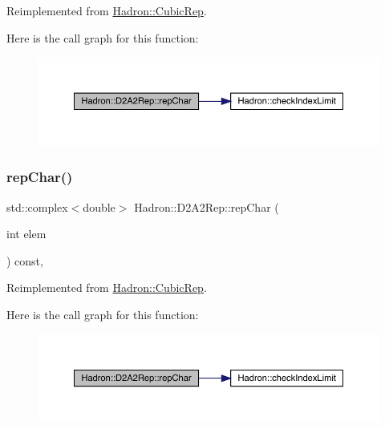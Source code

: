 Reimplemented from \mbox{\hyperlink{structHadron_1_1CubicRep_af45227106e8e715e84b0af69cd3b36f8}{Hadron\+::\+Cubic\+Rep}}.

Here is the call graph for this function\+:
\nopagebreak
\begin{figure}[H]
\begin{center}
\leavevmode
\includegraphics[width=350pt]{d2/dfc/structHadron_1_1D2A2Rep_a27712e402af9b022dee4cccf805ebe86_cgraph}
\end{center}
\end{figure}
\mbox{\label{structHadron_1_1D2A2Rep_a27712e402af9b022dee4cccf805ebe86}} 
\subsubsection{\texorpdfstring{repChar()}{repChar()}\hspace{0.1cm}{\footnotesize\ttfamily [3/3]}}
{\footnotesize\ttfamily std\+::complex$<$double$>$ Hadron\+::\+D2\+A2\+Rep\+::rep\+Char (\begin{DoxyParamCaption}\item[{int}]{elem }\end{DoxyParamCaption}) const\hspace{0.3cm}{\ttfamily [inline]}, {\ttfamily [virtual]}}



Reimplemented from \mbox{\hyperlink{structHadron_1_1CubicRep_af45227106e8e715e84b0af69cd3b36f8}{Hadron\+::\+Cubic\+Rep}}.

Here is the call graph for this function\+:
\nopagebreak
\begin{figure}[H]
\begin{center}
\leavevmode
\includegraphics[width=350pt]{d2/dfc/structHadron_1_1D2A2Rep_a27712e402af9b022dee4cccf805ebe86_cgraph}
\end{center}
\end{figure}
\mbox{\label{structHadron_1_1D2A2Rep_a75e7a00548888c39a9e3613c4b5178ef}} 

